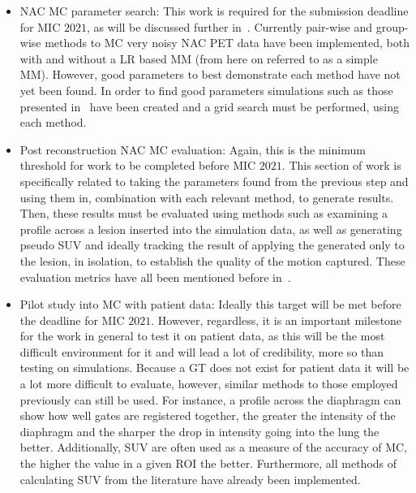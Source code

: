             \begin{itemize}
                \item \gls{NAC} \gls{MC} parameter search: This work is required for the submission deadline for \gls{MIC} $2021$, as will be discussed further in~. Currently pair-wise and group-wise methods to \gls{MC} very noisy \gls{NAC} \gls{PET} data have been implemented, both with and without a \gls{LR} based \gls{MM} (from here on referred to as a simple \gls{MM}). However, good parameters to best demonstrate each method have not yet been found. In order to find good parameters simulations such as those presented in~ have been created and a grid search must be performed, using each method.
    
                \item Post reconstruction \gls{NAC} \gls{MC} evaluation: Again, this is the minimum threshold for work to be completed before \gls{MIC} $2021$. This section of work is specifically related to taking the parameters found from the previous step and using them in, combination with each relevant method, to generate results. Then, these results must be evaluated using methods such as examining a profile across a lesion inserted into the simulation data, as well as generating pseudo \gls{SUV} and ideally tracking the result of applying the  generated only to the lesion, in isolation, to establish the quality of the motion captured. These evaluation metrics have all been mentioned before in~.
    
                \item Pilot study into \gls{MC} with patient data: Ideally this target will be met before the deadline for \gls{MIC} $2021$. However, regardless, it is an important milestone for the work in general to test it on patient data, as this will be the most difficult environment for it and will lead a lot of credibility, more so than testing on simulations. Because a \gls{GT} does not exist for patient data it will be a lot more difficult to evaluate, however, similar methods to those employed previously can still be used. For instance, a profile across the diaphragm can show how well gates are registered together, the greater the intensity of the diaphragm and the sharper the drop in intensity going into the lung the better. Additionally, \gls{SUV} are often used as a measure of the accuracy of \gls{MC}, the higher the value in a given \gls{ROI} the better. Furthermore, all methods of calculating \gls{SUV} from the literature have already been implemented.
    

\end{itemize}
